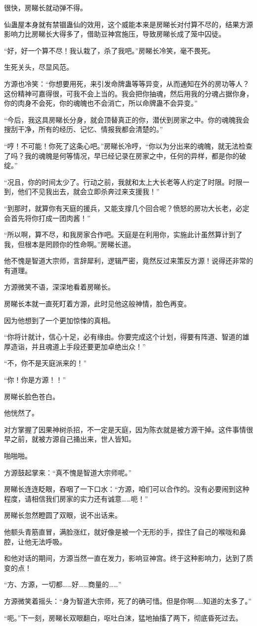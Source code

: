 \begin{this_body}
很快，房睇长就动弹不得。

仙蛊屋本身就有禁锢蛊仙的效用，这个威能本来是房睇长对付算不尽的，结果方源影响力比房睇长大得多了，借助豆神宫施压，导致房睇长成了笼中囚徒。

“好，好一个算不尽！我认栽了，杀了我吧。”房睇长冷笑，毫不畏死。

生死关头，尽显风范。

方源也冷笑：“你想要用死，来引发命牌蛊等等异变，从而通知在外的房功等人？这份精神可嘉得很，可我不会上当的。我会把你抽魂，然后用我的分魂占据你身，你的肉身不会死，你的魂魄也不会消亡，所以命牌蛊不会异变。”

“今后，我这具房睇长分身，就会顶替真正的你，潜伏到房家之中。你的魂魄我会搜刮干净，所有的经历、记忆、情报我都会清楚的。”

“哼！不可能！你死了这条心吧。”房睇长冷哼，“你以为分出来的魂魄，就无法检查了吗？我的魂魄是何等情况，早已经记录在房家之中，任何的异样，都是你的破绽。”

“况且，你的时间太少了。行动之前，我就和太上大长老等人约定了时限。时限一到，他们不见我出去，就会立即杀奔过来支援我！”

“到那时，就算你有天庭的援兵，又能支撑几个回合呢？愤怒的房功大长老，必定会首先将你打成一团肉酱！”

“所以啊，算不尽，和我房家合作吧。天庭是在利用你，实施此计虽然算计到了我，但根本是罔顾你的性命啊。”房睇长道。

他不愧是智道大宗师，言辞犀利，逻辑严密，竟然反过来策反方源！说得还非常的有道理。

方源微笑不语，深深地看着房睇长。

房睇长本就一直死盯着方源，此时见他这般神情，脸色再变。

因为他想到了一个更加惊悚的真相。

“你将计就计，信心十足，必有缘由。你要完成这个计划，得要有阵道、智道的雄厚造诣，并且魂道上手段还要更加卓绝出众！”

“不，你不是天庭派来的！”

“你！你是方源！！”

房睇长脸色苍白。

他恍然了。

对方掌握了因果神树杀招，不一定是天庭，因为陈衣就是被方源干掉。这件事情很早之前，就被方源自己捅出来，世人皆知。

啪啪啪。

方源鼓起掌来：“真不愧是智道大宗师呢。”

房睇长连连眨眼，吞咽了一下口水：“方源，咱们可以合作的。没有必要闹到这种程度，请相信我们房家的实力还有诚意……呃！”

房睇长忽然瞪圆了双眼，说不出话来。

他额头青筋直冒，满脸涨红，就好像是被一个无形的手，捏住了自己的喉咙和鼻腔，让他无法呼吸。

和他对话的期间，方源当然一直在发力，影响豆神宫。终于这种影响力，达到了质变的点！

“方、方源，一切都……好……商量的……”

方源微笑着摇头：“身为智道大宗师，死了的确可惜。但是你啊……知道的太多了。”

“呃。”下一刻，房睇长双眼翻白，呕吐白沫，猛地抽搐了两下，彻底昏死过去。

\end{this_body}

